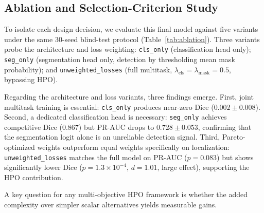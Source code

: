 \subsection{Ablation and Selection-Criterion Study}
\label{subsec:ablation}

To isolate each design decision, we evaluate this final model against five
variants under the same 30-seed blind-test protocol
(Table~\ref{tab:ablation}). Three variants probe the architecture and loss
weighting: \texttt{cls\_only} (classification head only); \texttt{seg\_only}
(segmentation head only, detection by thresholding mean mask probability);
and \texttt{unweighted\_losses} (full multitask, $\lambda_{\text{cls}} =
\lambda_{\text{mask}} = 0.5$, bypassing HPO). 

Regarding the architecture and loss variants, three findings emerge.
First, joint multitask training is essential:
\texttt{cls\_only} produces near-zero Dice ($0.002 \pm 0.008$). Second, a
dedicated classification head is necessary: \texttt{seg\_only} achieves
competitive Dice ($0.867$) but PR-AUC drops to $0.728 \pm 0.053$, confirming
that the segmentation logit alone is an unreliable detection signal. Third,
Pareto-optimized weights outperform equal weights specifically on localization:
\texttt{unweighted\_losses} matches the full model on PR-AUC ($p = 0.083$) but
shows significantly lower Dice ($p = 1.3 \times 10^{-4}$, $d = 1.01$, large
effect), supporting the HPO contribution.

A key question for any multi-objective HPO framework is whether the added
complexity over simpler scalar alternatives yields measurable gains. 

